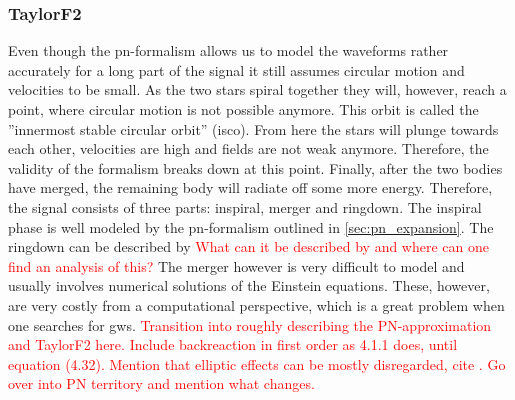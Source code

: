 \subsubsection{TaylorF2}
Even though the \gls{pn}-formalism allows us to model the waveforms rather accurately for a long part of the signal it still assumes circular motion and velocities to be small. As the two stars spiral together they will, however, reach a point, where circular motion is not possible anymore. This orbit is called the ''innermost stable circular orbit'' (\gls{isco}). From here the stars will plunge towards each other, velocities are high and fields are not weak anymore. Therefore, the validity of the formalism breaks down at this point. Finally, after the two bodies have merged, the remaining body will radiate off some more energy. Therefore, the signal consists of three parts: inspiral, merger and ringdown. The inspiral phase is well modeled by the \gls{pn}-formalism outlined in \autoref{sec:pn_expansion}. The ringdown can be described by \textcolor{red}{What can it be described by and where can one find an analysis of this?} The merger however is very difficult to model and usually involves numerical solutions of the Einstein equations. These, however, are very costly from a computational perspective, which is a great problem when one searches for \gls{gws}.
\textcolor{red}{Transition into roughly describing the PN-approximation and TaylorF2 here.}
\textcolor{red}{Include backreaction in first order as 4.1.1 \cite{gwv1} does, until equation (4.32). Mention that elliptic effects can be mostly disregarded, cite \cite{gwv1}. Go over into PN territory and mention what changes.}


